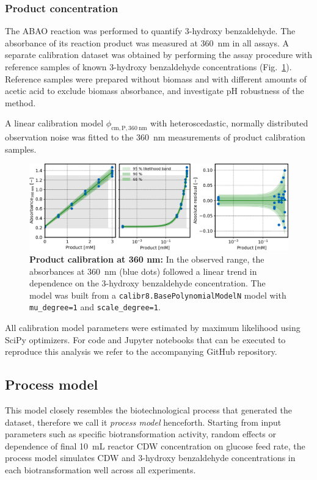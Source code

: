 \documentclass[sn-standardnature]{sn-jnl}%
\theoremstyle{thmstyleone}%
\theoremstyle{thmstyletwo}%
\theoremstyle{thmstylethree}%
\begin{document}
\subsubsection{Product concentration}
The ABAO reaction was performed to quantify 3-hydroxy benzaldehyde.
The absorbance of its reaction product was measured at 360~nm in all assays.
A separate calibration dataset was obtained by performing the assay procedure with reference samples of known 3-hydroxy benzaldehyde concentrations (Fig.~\ref{fig_cmPA360}).
Reference samples were prepared without biomass and with different amounts of acetic acid to exclude biomass absorbance, and investigate pH robustness of the method.

A linear calibration model $\phi_\mathrm{cm,P,360\ nm}$ with heteroscedastic, normally distributed observation noise was fitted to the 360~nm measurements of product calibration samples.

\begin{figure}[h]
    \centering
    \includegraphics[width=1.0\textwidth]{figures/cm_product_A360.png}
    \caption{
        \textbf{Product calibration at 360 nm:}
        In the observed range, the absorbances at 360~nm (blue dots) followed a linear trend in dependence on the 3-hydroxy benzaldehyde concentration.
        The model was built from a \texttt{calibr8.BasePolynomialModelN} model with \texttt{mu\_degree=1} and \texttt{scale\_degree=1}.
    }
    \label{fig_cmPA360}
\end{figure}

All calibration model parameters were estimated by maximum likelihood using SciPy optimizers.
For code and Jupyter notebooks that can be executed to reproduce this analysis we refer to the accompanying GitHub repository.


\subsection{Process model}
This model closely resembles the biotechnological process that generated the dataset, therefore we call it \textit{process model} henceforth.
Starting from input parameters such as specific biotransformation activity, random effects or dependence of final 10~mL reactor CDW concentration on glucose feed rate, the process model simulates CDW and 3-hydroxy benzaldehyde concentrations in each biotransformation well across all experiments.
\end{document}
